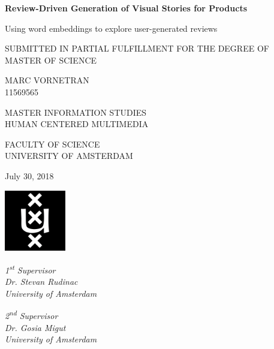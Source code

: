 \begin{titlepage}
    \begin{center}
    
        \Huge
        \textbf{Review-Driven Generation of Visual Stories for Products}
        
        \vspace{0.5cm}
        \LARGE
        Using word embeddings to explore user-generated reviews
        
        \vspace{1.5cm}
        
        SUBMITTED IN PARTIAL FULFILLMENT FOR THE DEGREE OF\\
        MASTER OF SCIENCE
        
        \vspace{1cm}
        
        MARC VORNETRAN\\
        11569565
        
        \vspace{1.5cm}
        
        MASTER INFORMATION STUDIES\\
        HUMAN CENTERED MULTIMEDIA
        
        \vspace{1cm}
        
        FACULTY OF SCIENCE\\
        UNIVERSITY OF AMSTERDAM
        
        \vspace{1.5cm}
        
        July 30, 2018
        
        \vspace{1.5cm}
        
        \includegraphics[width=0.2\textwidth]{assets/uva.png}
        
        \vfill
        
        \begin{minipage}[t]{0.68\textwidth}
            \textit{1\textsuperscript{st} Supervisor}\\
            \textit{Dr. Stevan Rudinac}\\
            \textit{University of Amsterdam}
        \end{minipage}
        \hfill
        \begin{minipage}[t]{0.28\textwidth}
            \textit{2\textsuperscript{nd} Supervisor}\\
            \textit{Dr. Gosia Migut}\\
            \textit{University of Amsterdam}
        \end{minipage}
        
    \end{center}
\end{titlepage}